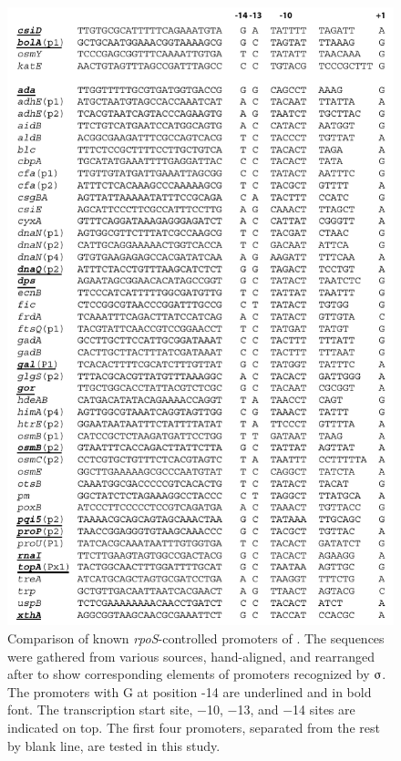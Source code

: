 \begin{figure}
\centering
\includegraphics{figures/chap5_promoter_align}
\caption[Comparison of \emph{rpoS}-controlled promoter of \emph{E.
coli}]{Comparison of known \emph{rpoS}-controlled promoters of
. The sequences were gathered from various sources,
hand-aligned, and rearranged after \citet{Becker2001} to show
corresponding elements of promoters recognized by
$\sigmaup$. The promoters with G at position -14 are
underlined and in bold font. The transcription start site, $-$10,
$-$13, and $-$14 sites are indicated on top. The first four
promoters, separated from the rest by blank line, are tested in
this study.} \label{chap5:promoter_comparison}
\end{figure}


